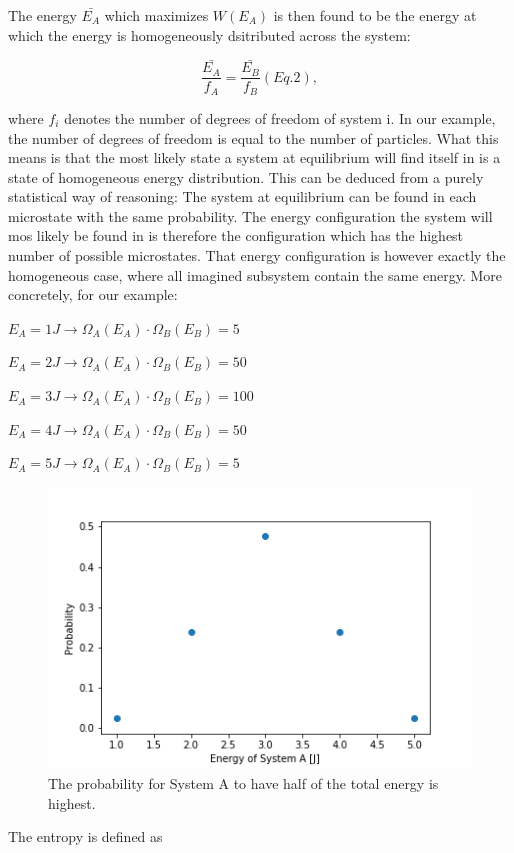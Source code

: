The energy $\bar{E_A}$ which maximizes $W(E_A)$ is then found to be the energy at which the energy is homogeneously dsitributed across the system:

$$\frac{\bar{E_A}}{f_A} = \frac{\bar{E_B}}{f_B} (Eq. 2),$$

where $f_i$ denotes the number of degrees of freedom of system i. In our example, the number of degrees of freedom is equal to the number of particles. What this means is that the most likely state a system at equilibrium will find itself in is a state of homogeneous energy distribution. This can be deduced from a purely statistical way of reasoning: The system at equilibrium can be found in each microstate with the same probability. The energy configuration the system will mos likely be found in is therefore the configuration which has the highest number of possible microstates. That energy configuration is however exactly the homogeneous case, where all imagined subsystem contain the same energy. More concretely, for our example:

$E_A = 1J \rightarrow \Omega_A(E_A)\cdot \Omega_B(E_B) = 5$

$E_A = 2J \rightarrow \Omega_A(E_A)\cdot \Omega_B(E_B) = 50$

$E_A = 3J \rightarrow \Omega_A(E_A)\cdot \Omega_B(E_B) = 100$

$E_A = 4J \rightarrow \Omega_A(E_A)\cdot \Omega_B(E_B) = 50$

$E_A = 5J \rightarrow \Omega_A(E_A)\cdot \Omega_B(E_B) = 5$


\begin{figure}
\includegraphics[scale=0.5]{images/FE_ex_3}
\caption{The probability for System A to have half of the total energy is highest.}
\end{figure}

The entropy is defined as 

